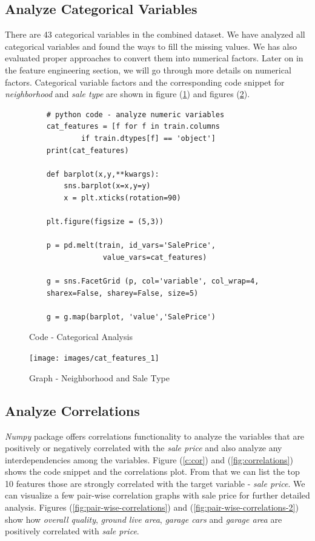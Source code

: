 \documentclass[sigconf]{acmart}
\begin{document}
	\subsection{Analyze Categorical Variables}
	There are 43 categorical variables in the combined dataset. We have analyzed all categorical variables and found the ways to fill the missing values. We has also evaluated proper approaches to convert them into numerical factors. Later on in the feature engineering section, we will go through more details on numerical factors. Categorical variable factors and the corresponding code snippet for {\em neighborhood} and {\em sale type} are shown in figure (\ref{c:analyze-cat}) and figures (\ref{fig:cat_features_1}).
	
	\begin{figure}[htb]
	\begin{verbatim}	
	# python code - analyze numeric variables
	cat_features = [f for f in train.columns 
			if train.dtypes[f] == 'object']
	print(cat_features)
	
	def barplot(x,y,**kwargs):
	    sns.barplot(x=x,y=y)
	    x = plt.xticks(rotation=90)
	
	plt.figure(figsize = (5,3))
	
	p = pd.melt(train, id_vars='SalePrice',
	             value_vars=cat_features)
	             
	g = sns.FacetGrid (p, col='variable', col_wrap=4, 
	sharex=False, sharey=False, size=5)
	
	g = g.map(barplot, 'value','SalePrice')				
	\end{verbatim}
	\caption{Code - Categorical Analysis} \label{c:analyze-cat} 
	\end{figure}

\begin{figure}[htb]
	\centering
	\texttt{[image: images/cat\_features\_1]}	
	\caption{Graph - Neighborhood and Sale Type} \label{fig:cat_features_1} 
\end{figure}
	
	\subsection{Analyze Correlations}		
	{\em Numpy} package offers correlations functionality to analyze the variables that are positively or negatively correlated with the {\em sale price} and also analyze any interdependencies among the variables. Figure (\ref{c:cor}) and (\ref{fig:correlations}) shows the code snippet and the correlations plot. From that we can list the top 10 features those are strongly correlated with the target variable - {\em sale price}. We can visualize a few pair-wise correlation graphs with sale price for further detailed analysis. Figures (\ref{fig:pair-wise-correlations}) and (\ref{fig:pair-wise-correlations-2}) show how {\em overall quality}, {\em ground live area}, {\em garage cars} and {\em garage area} are positively correlated with {\em sale price}.
	
\end{document}
